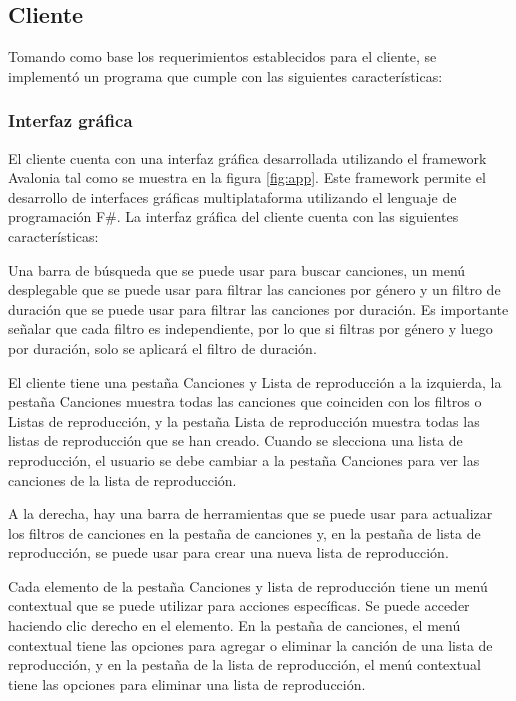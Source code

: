 \subsection{Cliente}

Tomando como base los requerimientos establecidos para el cliente, se
implementó un programa que cumple con las siguientes características:

\subsubsection{Interfaz gráfica}

El cliente cuenta con una interfaz gráfica desarrollada utilizando el framework
Avalonia tal como se muestra en la figura \ref{fig:app}. Este framework permite
el desarrollo de interfaces gráficas multiplataforma utilizando el lenguaje de
programación F\#. La interfaz gráfica del cliente cuenta con las siguientes
características:

Una barra de búsqueda que se puede usar para buscar canciones, un menú
desplegable que se puede usar para filtrar las canciones por género y un filtro
de duración que se puede usar para filtrar las canciones por duración. Es
importante señalar que cada filtro es independiente, por lo que si filtras por
género y luego por duración, solo se aplicará el filtro de duración.

El cliente tiene una pestaña Canciones y Lista de reproducción a la izquierda,
la pestaña Canciones muestra todas las canciones que coinciden con los filtros o
Listas de reproducción, y la pestaña Lista de reproducción muestra todas las
listas de reproducción que se han creado. Cuando se slecciona una lista de
reproducción, el usuario se debe cambiar a la pestaña Canciones para ver las
canciones de la lista de reproducción.

A la derecha, hay una barra de herramientas que se puede usar para actualizar
los filtros de canciones en la pestaña de canciones y, en la pestaña de lista de
reproducción, se puede usar para crear una nueva lista de reproducción.

Cada elemento de la pestaña Canciones y lista de reproducción tiene un menú
contextual que se puede utilizar para acciones específicas. Se puede acceder
haciendo clic derecho en el elemento. En la pestaña de canciones, el menú
contextual tiene las opciones para agregar o eliminar la canción de una lista de
reproducción, y en la pestaña de la lista de reproducción, el menú contextual
tiene las opciones para eliminar una lista de reproducción.

